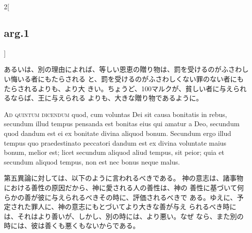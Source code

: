 \documentclass[paper=a4paper,fontsize=10pt,jafontsize=9pt,titlepage]{jlreq}
\begin{document}
\begin{paracol}{2}[\subsection{arg.1}]
\switchcolumn

あるいは、別の理由によれば、等しい恩恵の贈り物は、罰を受けるのがふさわしい悔いる者にもたらされる
 と、罰を受けるのがふさわしくない罪のない者にもたらされるよりも、より大
 きい。ちょうど、100マルクが、貧しい者に与えられるならば、王に与えられる
 よりも、大きな贈り物であるように。

\switchcolumn*[\subsection{ad.5}]


{\scshape Ad quintum dicendum} quod, cum voluntas Dei sit causa
 bonitatis in rebus, secundum illud tempus pensanda est bonitas eius qui
 amatur a Deo, secundum quod dandum est ei ex bonitate divina aliquod
 bonum. Secundum ergo illud tempus quo praedestinato peccatori dandum
 est ex divina voluntate maius bonum, melior est; licet secundum aliquod
 aliud tempus, sit peior; quia et secundum aliquod tempus, non est nec
 bonus neque malus.

\switchcolumn

第五異論に対しては、以下のように言われるべきである。
神の意志は、諸事物における善性の原因だから、神に愛される人の善性は、神の
 善性に基づいて何らかの善が彼に与えられるべきその時に、評価されるべきで
 ある。ゆえに、予定された罪人に、神の意志にもとづいてより大きな善が与え
 られるべき時には、それはより善いが、しかし、別の時には、より悪い。なぜ
 なら、また別の時には、彼は善くも悪くもないからである。

\end{paracol}
\newpage
\end{document}
